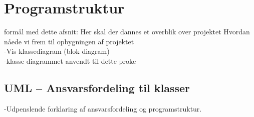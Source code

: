 \section{Programstruktur}
formål med dette afsnit: Her skal der dannes et overblik over projektet
Hvordan nåede vi frem til opbygningen af projektet\\

-Vis klassediagram (blok diagram)\\
-klasse diagrammet anvendt til dette proke


\subsection{UML – Ansvarsfordeling til klasser}
-Udpenslende forklaring af ansvarsfordeling og programstruktur.  